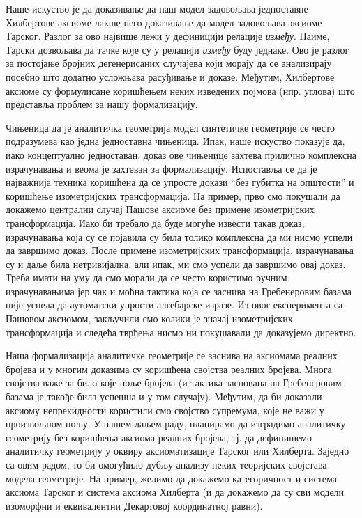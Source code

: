 Наше искуство је да доказивање да наш модел задовољава једноставне
Хилбертове аксиоме лакше него доказивање да модел задовољава аксиоме
Тарског. Разлог за ово највише лежи у дефиницији релације
\emph{између}. Наиме, Тарски дозвољава да тачке које су у релацији
\emph{између} буду једнаке. Ово је разлог за постојање бројних
дегенерисаних случајева који морају да се анализирају посебно што
додатно усложњава расуђивање и доказе. Међутим, Хилбертове аксиоме су
формулисане коришћењем неких изведених појмова (нпр. углова) што
представља проблем за нашу формализацију.

Чињеница да је аналитичка геометрија модел синтетичке геометрије се
често подразумева као једна једноставна чињеница. Ипак, наше искуство
показује да, иако концептуално једноставан, доказ ове чињенице захтева
прилично комплексна израчунавања и веома је захтеван за
формализацију. Испоставља се да је најважнија техника коришћена да се
упросте докази ``без губитка на општости'' и коришћење изометријских
трансформација. На пример, прво смо покушали да докажемо централни
случај Пашове аксиоме без примене изометријских трансформација. Иако
би требало да буде могуће извести такав доказ, израчунавања која су се
појавила су била толико комплексна да ми нисмо успели да завршимо
доказ. После примене изометријских трансформација, израчунавања су и
даље била нетривијална, али ипак, ми смо успели да завршимо овај
доказ. Треба имати на уму да смо морали да се често користимо ручним
израчунавањима јер чак и моћна тактика која се заснива на Гребенеровим
базама није успела да аутоматски упрости алгебарске изразе. Из овог
експеримента са Пашовом аксиомом, закључили смо колики је значај
изометријских трансформација и следећа тврђења нисмо ни покушавали да
доказујемо директно.

Наша формализација аналитичке геометрије се заснива на аксиомама
реалних бројева и у многим доказима су коришћена својства реалних
бројева. Многа својства важе за било које поље бројева (и тактика
заснована на Гребенеровим базама је такође била успешна и у том
случају). Међутим, да би доказали аксиому непрекидности користили смо
својство супремума, које не важи у произвољном пољу. У нашем даљем
раду, планирамо да изградимо аналитичку геометрију без коришћења
аксиома реалних бројева, тј. да дефинишемо аналитичку геометрију у
оквиру аксиоматизације Тарског или Хилберта. Заједно са овим радом, то
би омогућило дубљу анализу неких теоријских својстава модела
геометрије. На пример, желимо да докажемо категоричност и система
аксиома Тарског и система аксиома Хилберта (и да докажемо да су сви
модели изоморфни и еквивалентни Декартовој координатној равни).

